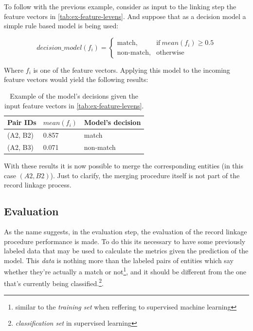 \documentclass[epsfig,a4paper,11pt,titlepage,twoside,openany]{book}
\begin{document}
To follow with the previous example, consider as input to the linking step
the feature vectors in \autoref{tab:ex-feature-levens}. And suppose that as a
decision model a simple rule based model is being used:

\begin{equation*}
  decision\_model(f_i) =
  \begin{cases}
    \text{match}, & \text{if}\ mean(f_i) \geq 0.5  \\
    \text{non-match}, & \text{otherwise}
  \end{cases}
\end{equation*}

Where $f_i$ is one of the feature vectors. Applying this model to the incoming
feature vectors would yield the following results:

\begin{table}[H]
  \centering
  \begin{tabular}{l|l|l}
    Pair IDs & $mean(f_i)$ & Model's decision \\ \hline
    (A2, B2) & 0.857       & match            \\
    (A2, B3) & 0.071       & non-match           
  \end{tabular}
  \caption{Example of the model's decisions given the input feature vectors in
    \autoref{tab:ex-feature-levens}.}
  \label{tab:ex-linking}
\end{table}

With these results it is now possible to merge the corresponding entities (in this case
$(A2, B2)$). Just to clarify, the merging procedure itself is not part of the
record linkage process.

\subsection{Evaluation}
\label{sec:rl-workflow-evaluation}

As the name suggests, in the evaluation step, the evaluation of the record linkage procedure performance is made. To do this its necessary to have some previously labeled data that  may  be used to calculate the metrics given the prediction of the model. This
\textit{data} is nothing more than the labeled pairs of entities which say whether
they're actually a match or not\footnote{similar to the \textit{training set} when reffering to supervised machine learning}, and it should be different
from the one that’s currently being classified.\footnote{\textit{classification
    set} in supervised learning}.
\end{document}
